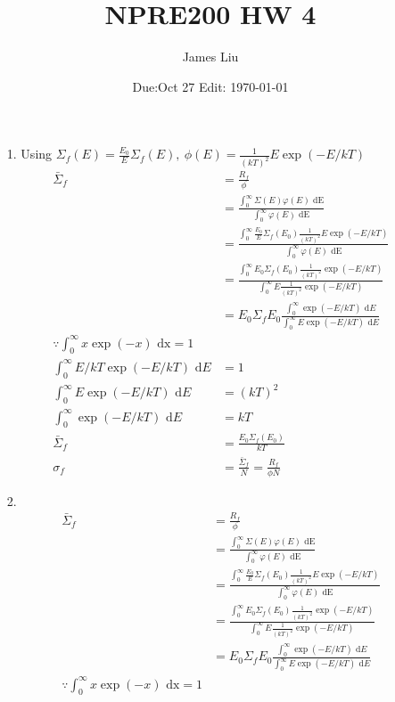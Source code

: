 \documentclass{article}
\date{Due:Oct 27 Edit: \today}
\title{NPRE200 HW 4}
\author{James Liu}
\begin{document}
\maketitle
\begin{itemize}
    \item [1.] Using \(\Sigma_f(E)=\frac{E_0}{E}\Sigma_f(E),\ \phi(E)=\frac{1}{(kT)^2}E\exp(-E/kT)\)
    \begin{align*}
        \bar{\Sigma}_f&=\frac{R_f}{\phi}\\
        &=\frac{\int_{0}^{\infty}\Sigma(E)\varphi(E)\text{ dE}}{\int_{0}^{\infty}\varphi(E)\text{ dE}}\\
        &=\frac{\int_{0}^{\infty}\frac{E_0}{E}\Sigma_f(E_0)\frac{1}{(kT)^2}E\exp(-E/kT)}{{\int_{0}^{\infty}\varphi(E)\text{ dE}}}\\
        &=\frac{\int_{0}^{\infty}E_0\Sigma_f(E_0)\frac{1}{(kT)^2}\exp(-E/kT)}{\int_{0}^{\infty}E\frac{1}{(kT)^2}\exp(-E/kT)}\\
        &=E_0\Sigma_f{E_0}\frac{\int_{0}^{\infty}\exp(-E/kT)\text{ d}E}{\int_{0}^{\infty}E\exp(-E/kT)\text{ d}E}\\
        \because \int_{0}^{\infty} x\exp(-x)\text{ dx}=1\\
        \int_{0}^{\infty}E/kT \exp(-E/kT) \text{ d}E&=1\\
        \int_{0}^{\infty}E \exp(-E/kT) \text{ d}E&=(kT)^2\\
        \int_{0}^{\infty}\exp(-E/kT)\text{ d}E&=kT\\
        \bar{\Sigma}_f&=\frac{E_0\Sigma_f(E_0)}{kT}\\
        \sigma_f &=\frac{\bar{\Sigma}_f}{N} =\frac{R_f}{\phi N}
    \end{align*}
    \item [2.]
    \begin{align*}
        \bar{\Sigma}_f&=\frac{R_f}{\phi}\\
        &=\frac{\int_{0}^{\infty}\Sigma(E)\varphi(E)\text{ dE}}{\int_{0}^{\infty}\varphi(E)\text{ dE}}\\
        &=\frac{\int_{0}^{\infty}\frac{E_0}{E}\Sigma_f(E_0)\frac{1}{(kT)^2}E\exp(-E/kT)}{{\int_{0}^{\infty}\varphi(E)\text{ dE}}}\\
        &=\frac{\int_{0}^{\infty}E_0\Sigma_f(E_0)\frac{1}{(kT)^2}\exp(-E/kT)}{\int_{0}^{\infty}E\frac{1}{(kT)^2}\exp(-E/kT)}\\
        &=E_0\Sigma_f{E_0}\frac{\int_{0}^{\infty}\exp(-E/kT)\text{ d}E}{\int_{0}^{\infty}E\exp(-E/kT)\text{ d}E}\\
        \because \int_{0}^{\infty} x\exp(-x)\text{ dx}=1\\

\end{align*}
\end{itemize}
\end{document}
